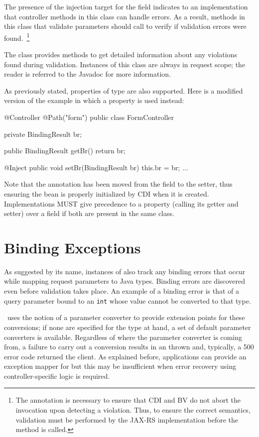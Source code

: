The presence of the injection target for the field 
 indicates to an implementation that controller methods in this
class can handle errors. As a result, methods in this class
that validate parameters should call  to verify if
validation errors were found.~\footnote{The  
annotation is necessary to ensure that CDI and BV do not abort the
invocation upon detecting a violation. Thus, to ensure the correct semantics, 
validation must be performed by the JAX-RS implementation before the method 
is called.}

The class  provides methods to get detailed information 
about any violations 
found during validation. Instances of this class are always in request
scope; the reader is referred to the Javadoc for more information.

As previously stated, properties of type  
are also supported. Here is a modified version of the example in which
a property is used instead:

\begin{listing}{1}
@Controller
@Path("form")
public class FormController {

    private BindingResult br;
    
    public BindingResult getBr() {
        return br;
    }

    @Inject
    public void setBr(BindingResult br) {
        this.br = br;
    }
    ...
}
\end{listing}

Note that the  annotation has been moved from the field to the setter,
thus ensuring the bean is properly initialized by CDI when it is
created. Implementations MUST give precedence to a property (calling its getter and
setter) over a field if both are present in the same class.
 
\section{Binding Exceptions}
\label{binding_exceptions}

As suggested by its name, instances of  also track any 
binding errors that occur while mapping request parameters to Java
types. Binding errors are discovered even before validation takes place. An
example of a binding error is that of a query parameter bound to an {\tt int} whose
value cannot be converted to that type. 

 \jaxrs\ uses the notion of a parameter converter
to provide extension points for these conversions; if none are specified for
the type at hand, a set of default parameter converters is available. Regardless
of where the parameter converter is coming from, a failure to carry out a 
conversion results in an  thrown and, typically,
a 500 error code returned the client. As explained before, applications can provide
an exception mapper for  but this may be
insufficient when error recovery using controller-specific logic is required. 

